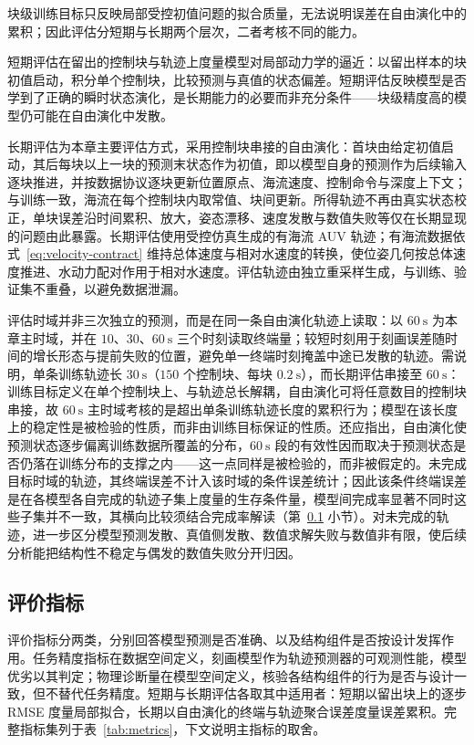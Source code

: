 块级训练目标只反映局部受控初值问题的拟合质量，无法说明误差在自由演化中的累积；因此评估分短期与长期两个层次，二者考核不同的能力。

短期评估在留出的控制块与轨迹上度量模型对局部动力学的逼近：以留出样本的块初值启动，积分单个控制块，比较预测与真值的状态偏差。短期评估反映模型是否学到了正确的瞬时状态演化，是长期能力的必要而非充分条件——块级精度高的模型仍可能在自由演化中发散。

长期评估为本章主要评估方式，采用控制块串接的自由演化：首块由给定初值启动，其后每块以上一块的预测末状态作为初值，即以模型自身的预测作为后续输入逐块推进，并按数据协议逐块更新位置原点、海流速度、控制命令与深度上下文；与训练一致，海流在每个控制块内取常值、块间更新。所得轨迹不再由真实状态校正，单块误差沿时间累积、放大，姿态漂移、速度发散与数值失败等仅在长期显现的问题由此暴露。长期评估使用受控仿真生成的有海流 AUV 轨迹；有海流数据依式~\eqref{eq:velocity-contract} 维持总体速度与相对水速度的转换，使位姿几何按总体速度推进、水动力配对作用于相对水速度。评估轨迹由独立重采样生成，与训练、验证集不重叠，以避免数据泄漏。

评估时域并非三次独立的预测，而是在同一条自由演化轨迹上读取：以 \(60~\mathrm{s}\) 为本章主时域，并在 \(10\)、\(30\)、\(60~\mathrm{s}\) 三个时刻读取终端量；较短时刻用于刻画误差随时间的增长形态与提前失败的位置，避免单一终端时刻掩盖中途已发散的轨迹。需说明，单条训练轨迹长 \(30~\mathrm{s}\)（\(150\) 个控制块、每块 \(0.2~\mathrm{s}\)），而长期评估串接至 \(60~\mathrm{s}\)：训练目标定义在单个控制块上、与轨迹总长解耦，自由演化可将任意数目的控制块串接，故 \(60~\mathrm{s}\) 主时域考核的是超出单条训练轨迹长度的累积行为；模型在该长度上的稳定性是被检验的性质，而非由训练目标保证的性质。还应指出，自由演化使预测状态逐步偏离训练数据所覆盖的分布，\(60~\mathrm{s}\) 段的有效性因而取决于预测状态是否仍落在训练分布的支撑之内——这一点同样是被检验的，而非被假定的。未完成目标时域的轨迹，其终端误差不计入该时域的条件误差统计；因此该条件终端误差是在各模型各自完成的轨迹子集上度量的生存条件量，模型间完成率显著不同时这些子集并不一致，其横向比较须结合完成率解读（第~\ref{subsec:metrics} 小节）。对未完成的轨迹，进一步区分模型预测发散、真值侧发散、数值求解失败与数值非有限，使后续分析能把结构性不稳定与偶发的数值失败分开归因。

\subsection{评价指标}
\label{subsec:metrics}

评价指标分两类，分别回答模型预测是否准确、以及结构组件是否按设计发挥作用。任务精度指标在数据空间定义，刻画模型作为轨迹预测器的可观测性能，模型优劣以其判定；物理诊断量在模型空间定义，核验各结构组件的行为是否与设计一致，但不替代任务精度。短期与长期评估各取其中适用者：短期以留出块上的逐步 RMSE 度量局部拟合，长期以自由演化的终端与轨迹聚合误差度量误差累积。完整指标集列于表~\ref{tab:metrics}，下文说明主指标的取舍。


